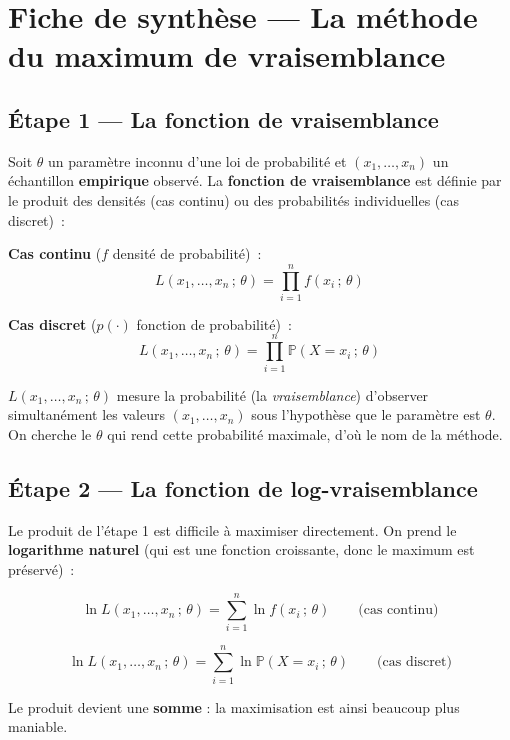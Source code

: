\documentclass[11pt,a4paper]{article}
\newcommand{\Prob}{\mathbb{P}}
\renewcommand{\P}{\Prob}
\begin{document}
\section{Fiche de synth\`ese --- La m\'ethode du maximum de vraisemblance}

\subsection{\'Etape 1 --- La fonction de vraisemblance}

\begin{defbox}
Soit $\theta$ un param\`etre inconnu d'une loi de probabilit\'e et $(x_1,\ldots,x_n)$ un \'echantillon \textbf{empirique} observ\'e. La \textbf{fonction de vraisemblance} est d\'efinie par le produit des densit\'es (cas continu) ou des probabilit\'es individuelles (cas discret)~:

\medskip
\textbf{Cas continu} ($f$ densit\'e de probabilit\'e)~:
$$L(x_1,\ldots,x_n\,;\,\theta) = \prod_{i=1}^{n} f(x_i\,;\,\theta)$$

\textbf{Cas discret} ($p(\cdot)$ fonction de probabilit\'e)~:
$$L(x_1,\ldots,x_n\,;\,\theta) = \prod_{i=1}^{n} \P(X=x_i\,;\,\theta)$$
\end{defbox}

\begin{exbox}
$L(x_1,\ldots,x_n\,;\,\theta)$ mesure la probabilit\'e (la \emph{vraisemblance}) d'observer simultan\'ement les valeurs $(x_1,\ldots,x_n)$ sous l'hypoth\`ese que le param\`etre est $\theta$. On cherche le $\theta$ qui rend cette probabilit\'e maximale, d'o\`u le nom de la m\'ethode.
\end{exbox}

\subsection{\'Etape 2 --- La fonction de log-vraisemblance}

\begin{defbox}
Le produit de l'\'etape 1 est difficile \`a maximiser directement. On prend le \textbf{logarithme naturel} (qui est une fonction croissante, donc le maximum est pr\'eserv\'e)~:

$$\ln L(x_1,\ldots,x_n\,;\,\theta) = \sum_{i=1}^{n} \ln f(x_i\,;\,\theta)
\qquad\text{(cas continu)}$$

$$\ln L(x_1,\ldots,x_n\,;\,\theta) = \sum_{i=1}^{n} \ln \P(X=x_i\,;\,\theta)
\qquad\text{(cas discret)}$$

Le produit devient une \textbf{somme} : la maximisation est ainsi beaucoup plus maniable.
\end{defbox}
\end{document}
